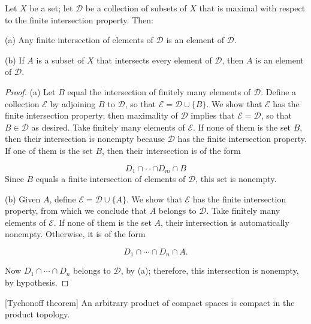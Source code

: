 \begin{lemma}
\label{lem:\thetheorem}
 Let \(X\) be a set; let \(\mathcal{D}\) be a collection of subsets of \(X\) that is maximal with respect to the finite intersection property. Then:

(a) Any finite intersection of elements of \(\mathcal{D}\) is an element of \(\mathcal{D}\).

(b) If \(A\) is a subset of \(X\) that intersects every element of \(\mathcal{D}\), then \(A\) is an element of \(\mathcal{D}\).
\end{lemma}

\begin{proof}
 (a) Let \(B\) equal the intersection of finitely many elements of \(\mathcal{D}\). Define a collection \(\mathcal{E}\) by adjoining \(B\) to \(\mathcal{D}\), so that \(\mathcal{E} = \mathcal{D} \cup \{ B\}\). We show that \(\mathcal{E}\) has the finite intersection property; then maximality of \(\mathcal{D}\) implies that \(\mathcal{E} = \mathcal{D}\), so that \(B \in \mathcal{D}\) as desired.
Take finitely many elements of \(\mathcal{E}\). If none of them is the set \(B\), then their intersection is nonempty because \(\mathcal{D}\) has the finite intersection property. If one of them is the set \(B\), then their intersection is of the form

\[
D_{1} \cap \cdot \cdot \cap {D}_{m} \cap B
\]
Since \(B\) equals a finite intersection of elements of \(\mathcal{D}\), this set is nonempty.

(b) Given \(A\), define \(\mathcal{E} = \mathcal{D} \cup \{ A\}\). We show that \(\mathcal{E}\) has the finite intersection property, from which we conclude that \(A\) belongs to \(\mathcal{D}\). Take finitely many elements of \(\mathcal{E}\). If none of them is the set \(A\), their intersection is automatically nonempty. Otherwise, it is of the form

\[
D_{1} \cap \cdots \cap {D}_{n} \cap A\text{.}
\]

Now \(D_{1} \cap \cdots \cap {D}_{n}\) belongs to \(\mathcal{D}\), by (a); therefore, this intersection is nonempty, by hypothesis.
\end{proof}
\begin{theorem}
\label{thm:\thetheorem}[Tychonoff theorem]
 An arbitrary product of compact spaces is compact in the product topology.
\end{theorem}

